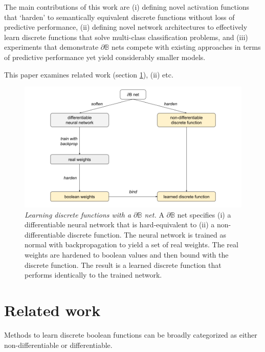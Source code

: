 \documentclass{article} %
\begin{document}
The main contributions of this work are (i) defining novel activation functions that `harden' to semantically equivalent discrete functions without loss of predictive performance, (ii) defining novel network architectures to effectively learn discrete functions that solve multi-class classification problems, and (iii) experiments that demonstrate $\partial \mathbb{B}$ nets compete with existing approaches in terms of predictive performance yet yield considerably smaller models.

This paper examines related work (section \ref{sec:related-work}), (ii) etc.

\begin{figure}[h]
	\centering
	\includegraphics[width=1.0\textwidth]{db-net.png}
	\caption{{\em Learning discrete functions with a $\partial\mathbb{B}$ net.} A $\partial \mathbb{B}$ net specifies (i) a differentiable neural network that is hard-equivalent to (ii) a non-differentiable discrete function. The neural network is trained as normal with backpropagation to yield a set of real weights. The real weights are hardened to boolean values and then bound with the discrete function. The result is a learned discrete function that performs identically to the trained network.}
	\label{fig:main-idea}
\end{figure}

\section{Related work}\label{sec:related-work}

Methods to learn discrete boolean functions can be broadly categorized as either non-differentiable or differentiable.
\end{document}
